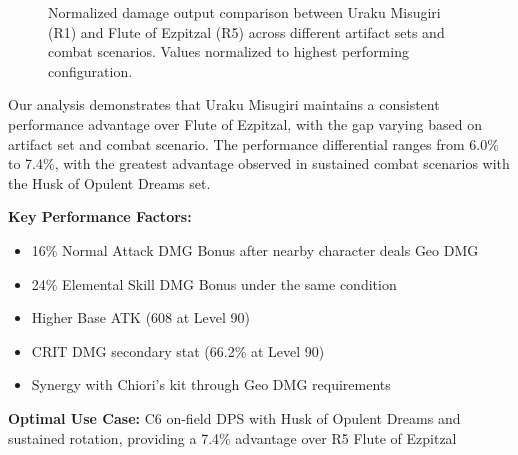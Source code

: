 \documentclass[12pt,a4paper]{article}
\begin{document}
\begin{figure}[H]
\centering
{}
\caption{Normalized damage output comparison between Uraku Misugiri (R1) and Flute of Ezpitzal (R5) across different artifact sets and combat scenarios. Values normalized to highest performing configuration.}
\label{fig:weapon_comparison}
\end{figure}

Our analysis demonstrates that Uraku Misugiri maintains a consistent performance advantage over Flute of Ezpitzal, with the gap varying based on artifact set and combat scenario. The performance differential ranges from 6.0\% to 7.4\%, with the greatest advantage observed in sustained combat scenarios with the Husk of Opulent Dreams set.

\begin{tcolorbox}[colback=geodark!5, colframe=geodark, title=Uraku Misugiri (R1)]
\textbf{Key Performance Factors:}
\begin{itemize}
    \item 16\% Normal Attack DMG Bonus after nearby character deals Geo DMG
    \item 24\% Elemental Skill DMG Bonus under the same condition
    \item Higher Base ATK (608 at Level 90)
    \item CRIT DMG secondary stat (66.2\% at Level 90)
    \item Synergy with Chiori's kit through Geo DMG requirements
\end{itemize}

\textbf{Optimal Use Case:} C6 on-field DPS with Husk of Opulent Dreams and sustained rotation, providing a 7.4\% advantage over R5 Flute of Ezpitzal
\end{tcolorbox}
\end{document}
